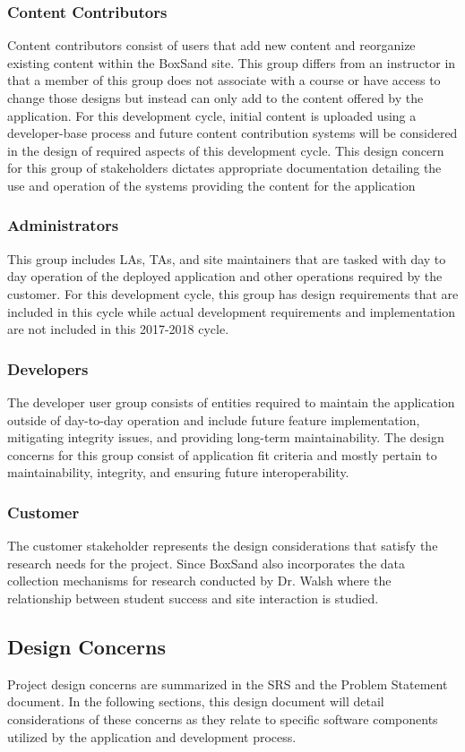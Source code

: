 \documentclass[onecolumn, draftclsnofoot,10pt, compsoc]{IEEEtran}
\begin{document}
\subsubsection*{Content Contributors}
Content contributors consist of users that add new content and reorganize existing content within the BoxSand site. This group differs from an instructor in that a member of this group does not associate with a course or have access to change those designs but instead can only add to the content offered by the application. For this development cycle, initial content is uploaded using a developer-base process and future content contribution systems will be considered in the design of required aspects of this development cycle. This design concern for this group of stakeholders dictates appropriate documentation detailing the use and operation of the systems providing the content for the application 
\subsubsection*{Administrators}
This group includes LAs, TAs, and site maintainers that are tasked with day to day operation of the deployed application and other operations required by the customer. For this development cycle, this group has design requirements that are included in this cycle while actual development requirements and implementation are not included in this 2017-2018 cycle. 
\subsubsection{Developers}
The developer user group consists of entities required to maintain the application outside of day-to-day operation and include future feature implementation, mitigating integrity issues, and providing long-term maintainability. The design concerns for this group consist of application fit criteria and mostly pertain to maintainability, integrity, and ensuring future interoperability. 
\subsubsection{Customer}
The customer stakeholder represents the design considerations that satisfy the research needs for the project. Since BoxSand also incorporates the data collection mechanisms for research conducted by Dr. Walsh where the relationship between student success and site interaction is studied. 
\subsection{Design Concerns}
Project design concerns are summarized in the SRS and the Problem Statement document. In the following sections, this design document will detail considerations of these concerns as they relate to specific software components utilized by the application and development process.
\end{document}
